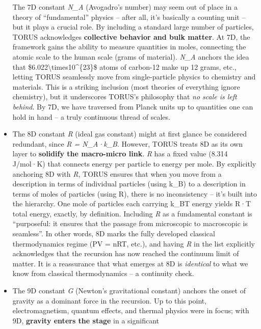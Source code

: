 \documentclass[
]{article}
\begin{document}
\begin{itemize}
  The 7D constant
  \emph{N_{A}{}}
  (Avogadro's number) may seem out of place in a theory of
  ``fundamental'' physics -- after all, it's basically a counting unit
  -- but it plays a crucial role. By including a standard large number
  of particles, TORUS acknowledges \textbf{collective behavior and bulk
  matter}. At 7D, the framework gains the ability to measure quantities
  in moles, connecting the atomic scale to the human scale (grams of
  material).
  \emph{N_{A}{}} anchors
  the idea that \$6.022\textbackslash times10\^{}\{23\}\$ atoms of
  carbon-12 make up 12 grams, etc., letting TORUS seamlessly move from
  single-particle physics to chemistry and materials. This is a striking
  inclusion (most theories of everything ignore chemistry), but it
  underscores TORUS's philosophy that \emph{no scale is left behind}. By
  7D, we have traversed from Planck units up to quantities one can hold
  in hand -- a truly continuous thread of scales\hspace{0pt}.
\item
  The 8D constant \emph{R} (ideal gas constant) might at first glance be
  considered redundant, since \emph{R =
  N_{A}·k_{B}{}}.
  However, TORUS treats 8D as its own layer to \textbf{solidify the
  macro-micro link}. \emph{R} has a fixed value (8.314 J/mol·K) that
  connects energy per particle to energy per mole. By explicitly
  anchoring 8D with \emph{R}, TORUS ensures that when you move from a
  description in terms of individual particles (using
  k_{B}) to a
  description in terms of moles of particles (using R), there is no
  inconsistency -- it's built into the hierarchy. One mole of particles
  each carrying k_{B}T
  energy yields R·T total energy, exactly, by definition. Including
  \emph{R} as a fundamental constant is ``purposeful: it ensures that
  the passage from microscopic to macroscopic is seamless''\hspace{0pt}.
  In other words, 8D marks the fully developed classical thermodynamics
  regime (PV = nRT, etc.), and having \emph{R} in the list explicitly
  acknowledges that the recursion has now reached the continuum limit of
  matter. It is a reassurance that what emerges at 8D is
  \emph{identical} to what we know from classical thermodynamics -- a
  continuity check.
\item
  The 9D constant \emph{G} (Newton's gravitational constant) anchors the
  onset of gravity as a dominant force in the recursion. Up to this
  point, electromagnetism, quantum effects, and thermal physics were in
  focus; with 9D, \textbf{gravity enters the stage} in a significant

\end{itemize}
\end{document}

